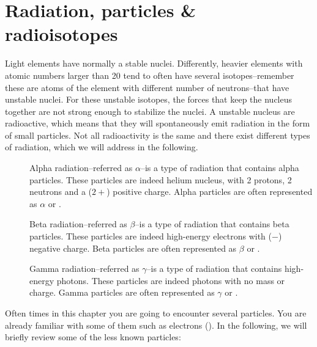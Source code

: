\documentclass[main.tex]{subfiles}
\begin{document}
\section{Radiation, particles \& radioisotopes}
Light elements have normally a stable nuclei. Differently, heavier elements with atomic numbers larger than 20 tend to often have several isotopes--remember these are atoms of the element with different number of neutrons--that have unstable nuclei. For these unstable isotopes, the forces that keep the nucleus together are not strong enough to stabilize the nuclei. A unstable nucleus are radioactive, which means that they will spontaneously emit radiation in the form of small particles. Not all radioactivity is the same and there exist different types of radiation, which we will address in the following.\sloppy 
\begin{description}
\item[] Alpha radiation--referred as $\alpha$--is a type of radiation that contains alpha particles. These particles are indeed helium nucleus, with 2 protons, 2 neutrons and a ($2+$) positive charge. Alpha particles are often represented as $\alpha$ or .
\item[] Beta radiation--referred as $\beta$--is a type of radiation that contains beta particles. These particles are indeed high-energy electrons with ($-$) negative charge. Beta particles are often represented as $\beta$ or .
\item[] Gamma radiation--referred as $\gamma$--is a type of radiation that contains high-energy photons. These particles are indeed photons with no mass or charge. Gamma particles are often represented as $\gamma$ or .
\end{description}
Often times in this chapter you are going to encounter several particles. You are already familiar with some of them such as electrons (). In the following, we will briefly review some of the less known particles:
\end{document}
